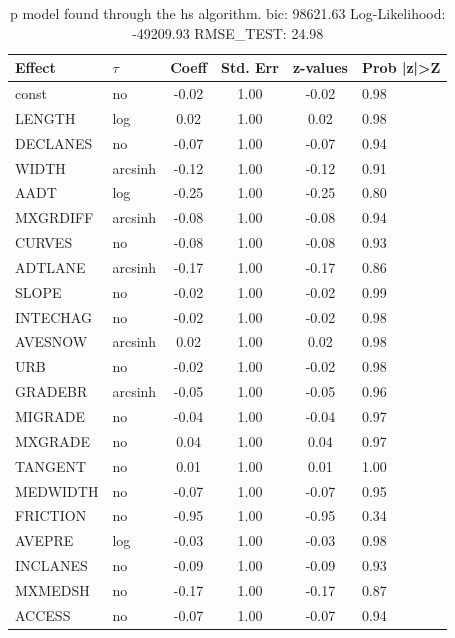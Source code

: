 \begin{table}
	\caption{p model found through the hs algorithm. bic: 98621.63 Log-Likelihood: -49209.93 RMSE_TEST: 24.98}
	\begin{center}
		\begin{tabular}{|l|l|c|c|c|l|}
			\hline
			Effect & $\tau$ & Coeff & Std. Err & z-values & Prob |z|>Z \\
			\hline
			const & no & -0.02 & 1.00 & -0.02 & 0.98 \\
			\hline
			LENGTH & log & 0.02 & 1.00 & 0.02 & 0.98 \\
			\hline
			DECLANES & no & -0.07 & 1.00 & -0.07 & 0.94 \\
			\hline
			WIDTH & arcsinh & -0.12 & 1.00 & -0.12 & 0.91 \\
			\hline
			AADT & log & -0.25 & 1.00 & -0.25 & 0.80 \\
			\hline
			MXGRDIFF & arcsinh & -0.08 & 1.00 & -0.08 & 0.94 \\
			\hline
			CURVES & no & -0.08 & 1.00 & -0.08 & 0.93 \\
			\hline
			ADTLANE & arcsinh & -0.17 & 1.00 & -0.17 & 0.86 \\
			\hline
			SLOPE & no & -0.02 & 1.00 & -0.02 & 0.99 \\
			\hline
			INTECHAG & no & -0.02 & 1.00 & -0.02 & 0.98 \\
			\hline
			AVESNOW & arcsinh & 0.02 & 1.00 & 0.02 & 0.98 \\
			\hline
			URB & no & -0.02 & 1.00 & -0.02 & 0.98 \\
			\hline
			GRADEBR & arcsinh & -0.05 & 1.00 & -0.05 & 0.96 \\
			\hline
			MIGRADE & no & -0.04 & 1.00 & -0.04 & 0.97 \\
			\hline
			MXGRADE & no & 0.04 & 1.00 & 0.04 & 0.97 \\
			\hline
			TANGENT & no & 0.01 & 1.00 & 0.01 & 1.00 \\
			\hline
			MEDWIDTH & no & -0.07 & 1.00 & -0.07 & 0.95 \\
			\hline
			FRICTION & no & -0.95 & 1.00 & -0.95 & 0.34 \\
			\hline
			AVEPRE & log & -0.03 & 1.00 & -0.03 & 0.98 \\
			\hline
			INCLANES & no & -0.09 & 1.00 & -0.09 & 0.93 \\
			\hline
			MXMEDSH & no & -0.17 & 1.00 & -0.17 & 0.87 \\
			\hline
			ACCESS & no & -0.07 & 1.00 & -0.07 & 0.94 \\
			\hline

\end{tabular}
\end{center}
\end{table}
